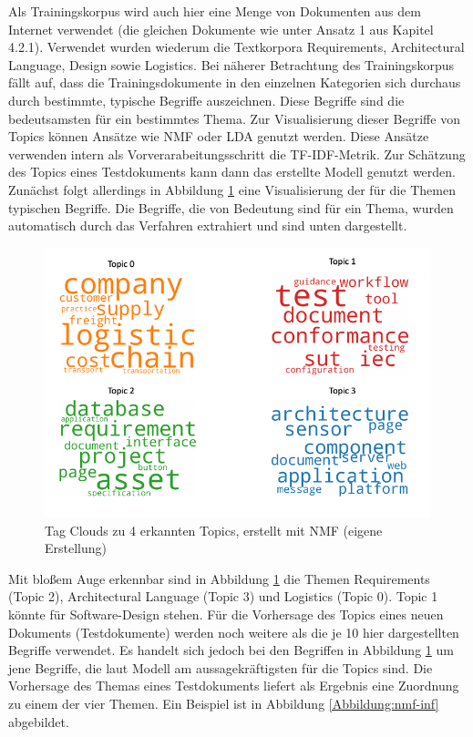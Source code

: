 Als Trainingskorpus wird auch hier eine Menge von Dokumenten aus dem Internet verwendet (die gleichen Dokumente wie unter Ansatz 1 aus Kapitel 4.2.1). Verwendet wurden  wiederum die Textkorpora Requirements, Architectural Language, Design sowie Logistics. Bei näherer Betrachtung des Trainingskorpus fällt auf, dass die Trainingsdokumente in den einzelnen Kategorien sich durchaus durch bestimmte, typische Begriffe auszeichnen. Diese Begriffe sind die bedeutsamsten für ein bestimmtes Thema. Zur Visualisierung dieser Begriffe von Topics können Ansätze wie NMF oder LDA genutzt werden. Diese Ansätze verwenden intern als Vorverarabeitungsschritt die TF-IDF-Metrik. Zur Schätzung des Topics eines Testdokuments kann dann das erstellte Modell genutzt werden. Zunächst folgt allerdings in Abbildung \ref{Abbildung:word-clouds} eine Visualisierung der für die Themen typischen Begriffe. Die Begriffe, die von Bedeutung sind für ein Thema, wurden automatisch durch das Verfahren extrahiert und sind unten dargestellt.
 
\begin{figure}[h]
\centering
\includegraphics[scale=0.95]{content/pics/Picture_18.png}
\caption{Tag Clouds zu 4 erkannten Topics, erstellt mit NMF (eigene Erstellung)}
\label{Abbildung:word-clouds}
\end{figure}

Mit bloßem Auge erkennbar sind in Abbildung \ref{Abbildung:word-clouds} die Themen Requirements (Topic 2), Architectural Language (Topic 3) und Logistics (Topic 0). Topic 1 könnte für Software-Design stehen. Für die Vorhersage des Topics eines neuen Dokuments (Testdokumente) werden noch weitere als die je 10 hier dargestellten Begriffe verwendet. Es handelt sich jedoch bei den Begriffen in Abbildung \ref{Abbildung:word-clouds} um jene Begriffe, die laut Modell am aussagekräftigsten für die Topics sind. Die Vorhersage des Themas eines Testdokuments liefert als Ergebnis eine Zuordnung zu einem der vier Themen. Ein Beispiel ist in Abbildung \ref{Abbildung:nmf-inf} abgebildet.

